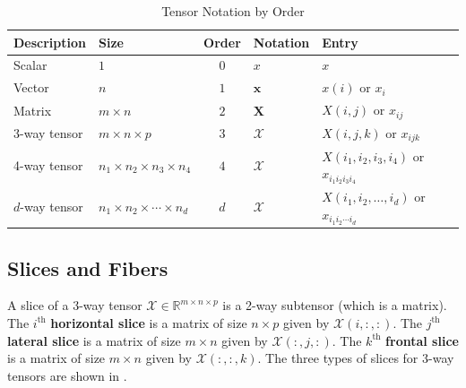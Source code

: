     \begin{table}[ht!]
        \centering
        \renewcommand{\arraystretch}{0.5}
        \begin{tabular}{@{}llcll@{}}
        \toprule
        \textbf{Description} & \textbf{Size} & \textbf{Order} & \textbf{Notation} & \textbf{Entry} \\ 
        \midrule
        Scalar         & $1$                         & $0$ & $x$        & $x$ \\
        Vector         & $n$                         & $1$ & $\mathbf{x}$        & $x(i)$ or $x_i$ \\
        Matrix         & $m \times n$                & $2$ & $\mathbf{X}$        & $X(i,j)$ or $x_{ij}$ \\
        3-way tensor   & $m \times n \times p$       & $3$ & $\mathcal{X}$       & $X(i,j,k)$ or $x_{ijk}$ \\
        4-way tensor   & $n_1 \times n_2 \times n_3 \times n_4$ & $4$ & $\mathcal{X}$ & $X(i_1,i_2,i_3,i_4)$ or $x_{i_1i_2i_3i_4}$ \\
        $d$-way tensor & $n_1 \times n_2 \times \cdots \times n_d$ & $d$ & $\mathcal{X}$ & $X(i_1, i_2, \dots, i_d)$ or $x_{i_1i_2\cdots i_d}$ \\
        \bottomrule
        \end{tabular}
        \caption{Tensor Notation by Order}
        \label{tab:tensor_notation}
    \end{table}

\subsection{Slices and Fibers} \label{sec:Slices and Fibers}
    A slice of a 3-way tensor $\mathcal{X}\in\mathbb{R}^{m\times n\times p}$ is
    a 2-way subtensor (which is a matrix). The $i^\text{th}$ \textbf{horizontal
    slice} is a matrix of size $n \times p$ given by $\mathcal{X}(i, :, :)$. The
    $j^\text{th}$ \textbf{lateral slice} is a matrix of size $m\times n$ given
    by $\mathcal{X}(:, j, :)$. The $k^\text{th}$ \textbf{frontal slice} is a
    matrix of size $m\times n$ given by $\mathcal{X}(:, :, k)$. The three types
    of slices for 3-way tensors are shown in .

